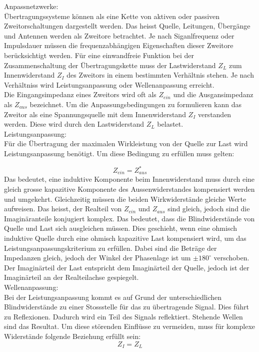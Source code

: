 Anpassnetzwerke: \\
Übertragungssysteme können als eine Kette von aktiven oder passiven  Zweitorschaltungen dargestellt werden. Das heisst Quelle, Leitungen, Übergänge und Antennen werden als Zweitore betrachtet. Je nach Siganlfrequenz oder Impulsdauer müssen die frequenzabhängigen Eigenschaften dieser Zweitore berücksichtigt werden. Für eine einwandfreie Funktion bei der Zusammenschaltung der Übertragungskette muss der Lastwiderstand $Z_L$ zum Innenwiderstand $Z_I$ des Zweitors in einem bestimmten Verhältnis stehen. Je nach Verhältniss wird Leistungsanpassung oder Wellenanpassung erreicht. \\
Die Eingangsimpedanz eines Zweitors wird oft als $Z_{ein}$ und die Ausgansimpedanz als $Z_{aus}$ bezeichnet. 
Um die Anpassungsbedingungen zu formulieren kann das Zweitor als eine Spannungsquelle mit dem Innenwiderstand $Z_I$ verstanden werden. Diese wird  durch den Lastwiderstand $Z_L$ belastet.\\

Leistungsanpassung: \\
Für die Übertragung der maximalen Wirkleistung von der Quelle zur Last  wird Leistungsanpassung benötigt. Um diese Bedingung zu erfüllen muss gelten:

\[Z_{ein} = Z_{aus}^*\]
Das bedeutet, eine induktive Komponente beim Innenwiderstand muss  durch eine gleich grosse kapazitive Komponente des Aussenwiderstandes kompensiert werden und umgekehrt. Gleichzeitig müssen die beiden Wirkwiderstände gleiche Werte aufweisen. Das heisst, der Realteil von $Z_{ein}$ und $Z_{aus}$ sind gleich, jedoch sind die Imaginäranteile konjugiert komplex. Das bedeutet, dass die Blindwiderstände von Quelle und Last sich ausgleichen müssen. Dies geschieht, wenn eine ohmisch induktive Quelle durch eine ohmisch kapazitive Last kompensiert wird, um das Leistungsanpassungskriterium zu erfüllen. Dabei sind die Beträge der Impedanzen gleich, jedoch der Winkel der Phasenlage ist um $\pm 180^\circ$  verschoben. Der Imaginärteil der Last entspricht dem Imaginärteil der Quelle, jedoch ist der Imaginärteil an der Realteilachse gespiegelt.\\

Wellenanpassung: \\
Bei der Leistungsanpassung kommt es auf Grund der unterschiedlichen Blindwiderstände zu einer Stossstelle für das zu übertragende Signal. Dies führt zu Reflexionen. Dadurch wird  ein Teil des Signals reflektiert. Stehende Wellen sind das Resultat. Um diese störenden Einflüsse zu vermeiden, muss für komplexe Widerstände folgende Beziehung erfüllt sein:
\[Z_{I} = Z_{L}\]

